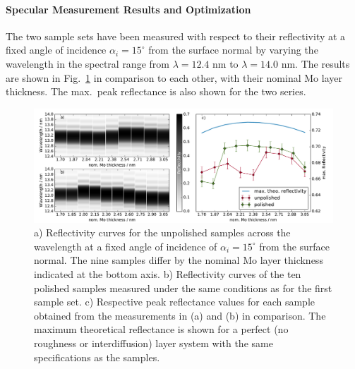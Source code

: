 \paragraph{Specular Measurement Results and Optimization} \label{sec:mo_si_model_reconstruction_results}
The two sample sets have been measured with respect to their reflectivity at a fixed angle of incidence $\alpha_i=15^\circ$ from the surface normal by varying the wavelength in the spectral range from $\lambda=12.4$ nm to $\lambda=14.0$ nm. The results are shown in Fig.~\ref{fig:EUV_reflectivity} in comparison to each other, with their nominal Mo layer thickness. The max.~peak reflectance is also shown for the two series.
\begin{figure}[htbp]
\centering
\includegraphics[width=\textwidth]{images/EUV_reflectivity_with_peak}
\caption{a) Reflectivity curves for the unpolished samples across the wavelength at a fixed angle of incidence of $\alpha_i = 15^\circ$ from the surface normal. The nine samples differ by the nominal Mo layer thickness indicated at the bottom axis. b) Reflectivity curves of the ten polished samples measured under the same conditions as for the first sample set. c) Respective peak reflectance values for each sample obtained from the measurements in (a) and (b) in comparison. The maximum theoretical reflectance is shown for a perfect (no roughness or interdiffusion) layer system with the same specifications as the samples.}
\label{fig:EUV_reflectivity}
\end{figure}

